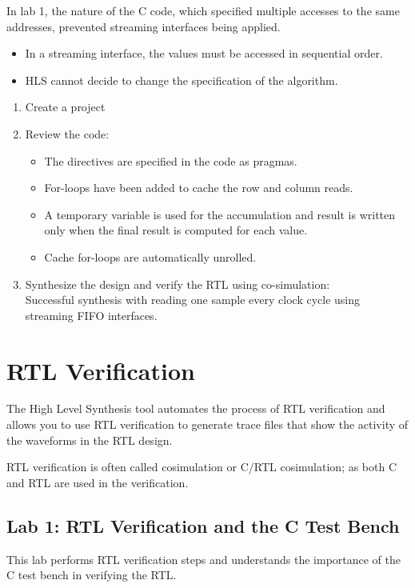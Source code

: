 \par In lab 1, the nature of the C code, which specified multiple accesses to the same addresses, prevented streaming interfaces being applied.
\begin{itemize}
    \item In a streaming interface, the values must be accessed in sequential order.
    \item HLS cannot decide to change the specification of the algorithm.
\end{itemize}

\begin{enumerate}[label=Step \arabic*:]
    \item Create a project    
    \item Review the code:\\ 
    \begin{itemize}
        \item The directives are specified in the code as pragmas.
        \item For-loops have been added to cache the row and column reads.
        \item A temporary variable is used for the accumulation and result is written only when the final result is computed for each value.
        \item Cache for-loops are automatically unrolled.
    \end{itemize}
    \item Synthesize the design and verify the RTL using co-simulation:\\ Successful synthesis with reading one sample every clock cycle using streaming FIFO interfaces.
\end{enumerate}

\section{RTL Verification}
The High Level Synthesis tool automates the process of RTL verification and allows you to use RTL verification to generate trace files that show the activity of the waveforms in the RTL design. 

RTL verification is often called cosimulation or C/RTL cosimulation; as both C and RTL are used in the verification.

\subsection{Lab 1: RTL Verification and the C Test Bench}
This lab performs RTL verification steps and understands the importance of the C test bench in verifying the RTL.

